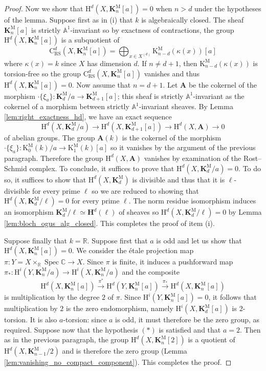 \documentclass[11pt,leqno]{amsart}
\newcommand{\Spec}{\operatorname{Spec}}
\renewcommand{\1}{{\rm 1\hspace*{-0.4ex}%
\rule{0.1ex}{1.52ex}\hspace*{0.2ex}}}
\newcommand{\Hr}{{\mathrm {H}}}
\newcommand{\<}[1]{{\langle}#1 {\rangle}}
\newcommand{\Rb}{\mathbb{R}}
\newcommand{\Kr}{\mathrm{K}}
\newcommand{\Abf}{\mathbf{A}}
\newcommand{\Cr}{\mathrm{C}}
\newcommand{\RS}{\mathrm{RS}}
\newcommand{\Cb}{\mathbb{C}}
\newcommand{\Kbf}{\mathbf{K}}
\newcommand{\Abb}{\mathbb{A}}
\newcommand{\Mr}{\mathrm{M}}
\newcommand{\Hbf}{\mathbf{H}}
\theoremstyle{plain}
\theoremstyle{definition}
\theoremstyle{remark}
\numberwithin{equation}{section}
\begin{document}
\begin{proof}
Now we show that $\Hr^d(X,\Kbf_n^\Mr[a])=0$ when $n>d$ under the hypotheses of the lemma. Suppose first as in (i) that $k$ is algebraically closed. The sheaf $\Kbf_n^\Mr[a]$ is strictly $\Abb^1$-invariant so by exactness of contractions, the group $\Hr^d(X,\Kbf_n^\Mr[a])$ is a subquotient of \[\Cr_\RS^d(X,\Kbf_n^\Mr[a])=\bigoplus_{x\in X^{(d)}}\Kr_{n-d}^\Mr(\kappa(x))[a]\] where $\kappa(x)=k$ since $X$ has dimension $d$. If $n\neq d+1$, then $\Kr_{n-d}^\Mr(\kappa(x))$ is torsion-free so the group $\Cr_\RS^d(X,\Kbf_n^\Mr[a])$ vanishes and thus $\Hr^d(X,\Kbf_n^\Mr[a])=0$. Now assume that $n=d+1$. Let $\Abf$ be the cokernel of the morphism $\cdot\{\xi_a\}:\Kbf_d^\Mr/a\rightarrow\Kbf_{d+1}^\Mr[a]$; this sheaf is strictly $\Abb^1$-invariant as the cokernel of a morphism between strictly $\Abb^1$-invariant sheaves. By Lemma \ref{lem:right_exactness_hd}, we have an exact sequence \[\Hr^d(X,\Kbf_d^\Mr/a)\rightarrow\Hr^d(X,\Kbf_{d+1}^\Mr[a])\rightarrow\Hr^d(X,\Abf)\rightarrow 0\] of abelian groups. The group $\Abf(k)$ is the cokernel of the morphism $\cdot\{\xi_a\}:\Kr_0^\Mr(k)/a\to\Kr_1^\Mr(k)[a]$ so it vanishes by the argument of the previous paragraph. Therefore the group $\Hr^d(X,\Abf)$ vanishes by examination of the Rost--Schmid complex. To conclude, it suffices to prove that $\Hr^d(X,\Kbf_d^\Mr/a)=0$. To do so, it suffices to show that $\Hr^d(X,\Kbf_d^\Mr)$ is divisible and thus that it is $\ell$-divisible for every prime $\ell$ so we are reduced to showing that $\Hr^d(X,\Kbf_d^\Mr/\ell)=0$ for every prime $\ell$. The norm residue isomorphism induces an isomorphism $\Kbf_d^\Mr/\ell\simeq\Hbf^d(\ell)$ of sheaves so $\Hr^d(X,\Kbf_d^\Mr/\ell)=0$ by Lemma \ref{lem:bloch_ogus_alg_closed}. This completes the proof of item (i).

Suppose finally that $k=\Rb$. Suppose first that $a$ is odd and let us show that $\Hr^d(X,\Kbf_n^\Mr[a])=0$. We consider the étale projection map $\pi:Y=X\times_\Rb\Spec\Cb\rightarrow X$. Since $\pi$ is finite, it induces a pushforward map $\pi_*:\Hr^i(Y,\Kbf_n^\Mr/a)\rightarrow\Hr^i(X,\Kbf_n^\Mr/a)$  and the composite \[\Hr^d(X,\Kbf_n^\Mr[a])\xrightarrow{\pi^*}\Hr^d(Y,\Kbf_n^\Mr[a])\xrightarrow{\pi_*}\Hr^d(X,\Kbf_n^\Mr[a])\] is multiplication by the degree $2$ of $\pi$. Since $\Hr^i(Y,\Kbf_n^\Mr[a])=0$, it follows that multiplication by $2$ is the zero endomorphism, namely $\Hr^i(X,\Kbf_d^\Mr[a])$ is $2$-torsion. It is also $a$-torsion: since $a$ is odd, it must therefore be the zero group, as required. Suppose now that the hypothesis $(*)$ is satisfied and that $a=2$. Then as in the previous paragraph, the group $\Hr^d(X,\Kbf_n^\Mr[2])$ is a quotient of $\Hr^d(X,\Kbf_{n-1}^\Mr/2)$ and is therefore the zero group (Lemma \ref{lem:vanishing_no_compact_component}). This completes the proof.
\end{proof}
\end{document}
